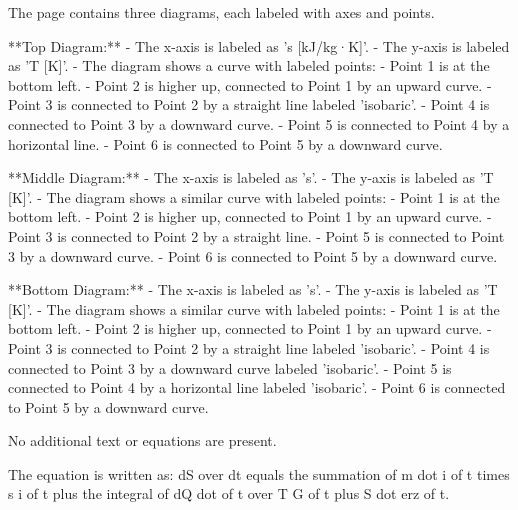The page contains three diagrams, each labeled with axes and points.  

**Top Diagram:**  
- The x-axis is labeled as 's [kJ/kg·K]'.  
- The y-axis is labeled as 'T [K]'.  
- The diagram shows a curve with labeled points:  
  - Point 1 is at the bottom left.  
  - Point 2 is higher up, connected to Point 1 by an upward curve.  
  - Point 3 is connected to Point 2 by a straight line labeled 'isobaric'.  
  - Point 4 is connected to Point 3 by a downward curve.  
  - Point 5 is connected to Point 4 by a horizontal line.  
  - Point 6 is connected to Point 5 by a downward curve.  

**Middle Diagram:**  
- The x-axis is labeled as 's'.  
- The y-axis is labeled as 'T [K]'.  
- The diagram shows a similar curve with labeled points:  
  - Point 1 is at the bottom left.  
  - Point 2 is higher up, connected to Point 1 by an upward curve.  
  - Point 3 is connected to Point 2 by a straight line.  
  - Point 5 is connected to Point 3 by a downward curve.  
  - Point 6 is connected to Point 5 by a downward curve.  

**Bottom Diagram:**  
- The x-axis is labeled as 's'.  
- The y-axis is labeled as 'T [K]'.  
- The diagram shows a similar curve with labeled points:  
  - Point 1 is at the bottom left.  
  - Point 2 is higher up, connected to Point 1 by an upward curve.  
  - Point 3 is connected to Point 2 by a straight line labeled 'isobaric'.  
  - Point 4 is connected to Point 3 by a downward curve labeled 'isobaric'.  
  - Point 5 is connected to Point 4 by a horizontal line labeled 'isobaric'.  
  - Point 6 is connected to Point 5 by a downward curve.  

No additional text or equations are present.

The equation is written as:  
dS over dt equals the summation of m dot i of t times s i of t plus the integral of dQ dot of t over T G of t plus S dot erz of t.